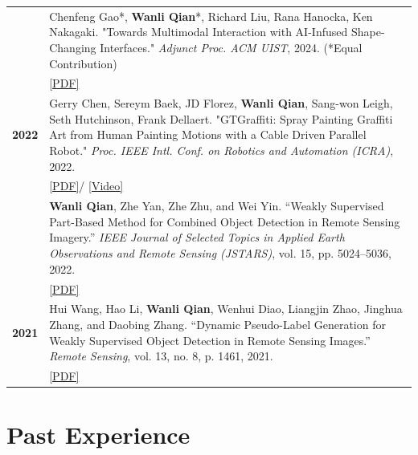 \documentclass[12pt, letterpaper]{article}
\newlength{\datecolwidth}
\begin{document}
\begin{tabularx}{\textwidth}{@{}p{\datecolwidth} X@{}}
    & Chenfeng Gao*, \textbf{Wanli Qian}*, Richard Liu, Rana Hanocka, Ken Nakagaki. "Towards Multimodal Interaction with AI-Infused Shape-Changing Interfaces." \textit{Adjunct Proc. ACM UIST}, 2024. (*Equal Contribution) \\
    & \href{https://dl.acm.org/doi/10.1145/3672539.3686315}{[PDF]} \\[6pt]

    \textbf{2022} & Gerry Chen, Sereym Baek, JD Florez, \textbf{Wanli Qian}, Sang-won Leigh, Seth Hutchinson, Frank Dellaert. "GTGraffiti: Spray Painting Graffiti Art from Human Painting Motions with a Cable Driven Parallel Robot." \textit{Proc. IEEE Intl. Conf. on Robotics and Automation (ICRA)}, 2022. \\
    & \href{https://ieeexplore.ieee.org/document/9812008}{[PDF]}/ \href{https://www.youtube.com/watch?v=R4ySYTNGv6s}{[Video]} \\[6pt]

    & \textbf{Wanli Qian}, Zhe Yan, Zhe Zhu, and Wei Yin. 
    ``Weakly Supervised Part-Based Method for Combined Object Detection in Remote Sensing Imagery.'' 
    \textit{IEEE Journal of Selected Topics in Applied Earth Observations and Remote Sensing (JSTARS)}, 
    vol. 15, pp. 5024--5036, 2022. \\ & \href{https://ieeexplore.ieee.org/document/9789416}{[PDF]} \\[6pt]

    \textbf{2021} & Hui Wang, Hao Li, \textbf{Wanli Qian}, Wenhui Diao, Liangjin Zhao, Jinghua Zhang, and Daobing Zhang. 
    ``Dynamic Pseudo-Label Generation for Weakly Supervised Object Detection in Remote Sensing Images.'' 
    \textit{Remote Sensing}, vol. 13, no. 8, p. 1461, 2021. \\ & \href{https://www.mdpi.com/2072-4292/13/8/1461}{[PDF]} \\[6pt]

\end{tabularx}

\section*{Past Experience}
\end{document}
